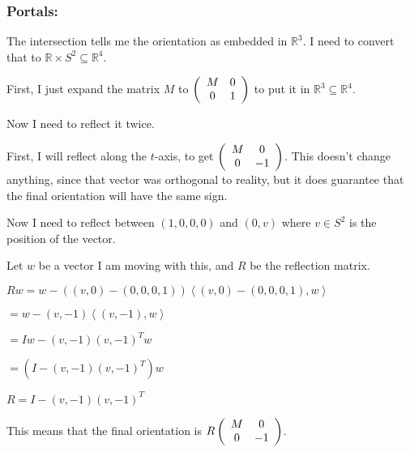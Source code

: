\bigskip

\subsubsection{Portals:}

The intersection tells me the orientation as embedded in $\mathbb{R}^3$. I need to convert that to $\mathbb{R} \times S^2 \subseteq \mathbb{R}^4$.

First, I just expand the matrix $M$ to $\left(\begin{array}{ccc} M & 0 \\0 & 1 \end{array} \right)$ to put it in $\mathbb{R}^3 \subseteq \mathbb{R}^4$.

Now I need to reflect it twice.

First, I will reflect along the $t$-axis, to get $\left(\begin{array}{ccc} M & 0 \\0 & -1 \end{array} \right)$. This doesn't change anything, since that vector was orthogonal to reality, but it does guarantee that the final orientation will have the same sign.

Now I need to reflect between $(1,0,0,0)$ and $(0,v)$ where $v \in S^2$ is the position of the vector.

Let $w$ be a vector I am moving with this, and $R$ be the reflection matrix.

$Rw = w - ((v,0)-(0,0,0,1))\left<(v,0)-(0,0,0,1),w\right>$

$= w - (v,-1)\left<(v,-1),w\right>$

$= Iw - (v,-1)(v,-1)^Tw$

$= (I - (v,-1)(v,-1)^T)w$

$R = I - (v,-1)(v,-1)^T$

This means that the final orientation is $R\left(\begin{array}{ccc} M & 0 \\0 & -1 \end{array} \right)$.